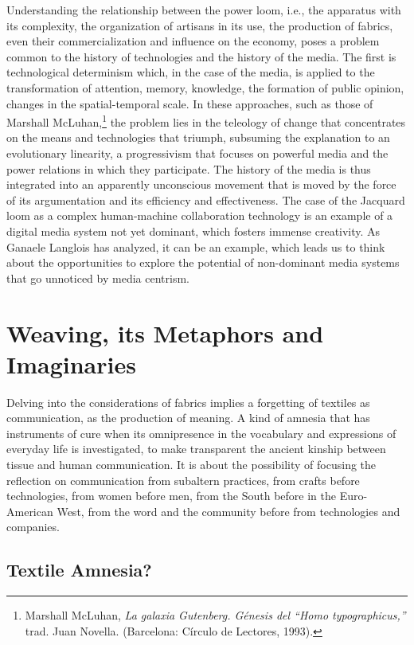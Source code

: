\documentclass{tufte-handout}
\begin{document}
Understanding the relationship between the power loom, i.e., the
apparatus with its complexity, the organization of artisans in its use,
the production of fabrics, even their commercialization and influence on
the economy, poses a problem common to the history of technologies and
the history of the media. The first is technological determinism which,
in the case of the media, is applied to the transformation of attention,
memory, knowledge, the formation of public opinion, changes in the
spatial-temporal scale. In these approaches, such as those of Marshall
McLuhan,\footnote{Marshall McLuhan, \emph{La galaxia Gutenberg. Génesis
  del ``Homo typographicus,''} trad. Juan Novella. (Barcelona: Círculo
  de Lectores, 1993).} the problem lies in the teleology of change that
concentrates on the means and technologies that triumph, subsuming the
explanation to an evolutionary linearity, a progressivism that focuses
on powerful media and the power relations in which they participate. The
history of the media is thus integrated into an apparently unconscious
movement that is moved by the force of its argumentation and its
efficiency and effectiveness. The case of the Jacquard loom as a complex
human-machine collaboration technology is an example of a digital media
system not yet dominant, which fosters immense creativity. As Ganaele
Langlois has analyzed, it can be an example, which leads us to think
about the opportunities to explore the potential of non-dominant media
systems that go unnoticed by media centrism.

\hypertarget{weaving-its-metaphors-and-imaginaries}{%
\section{Weaving, its Metaphors and
Imaginaries}\label{weaving-its-metaphors-and-imaginaries}}

Delving into the considerations of fabrics implies a forgetting of
textiles as communication, as the production of meaning. A kind of
amnesia that has instruments of cure when its omnipresence in the
vocabulary and expressions of everyday life is investigated, to make
transparent the ancient kinship between tissue and human communication.
It is about the possibility of focusing the reflection on communication
from subaltern practices, from crafts before technologies, from women
before men, from the South before in the Euro-American West, from the
word and the community before from technologies and companies.

\hypertarget{textile-amnesia}{%
\subsection{Textile
Amnesia?}\label{textile-amnesia}}
\end{document}

